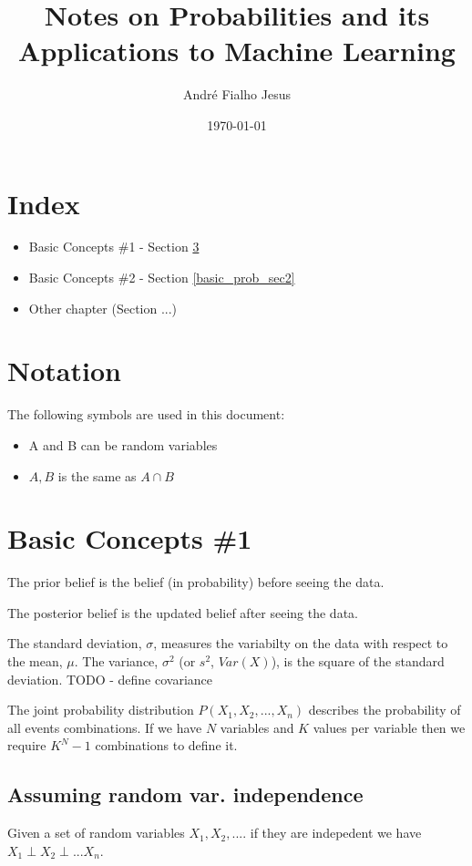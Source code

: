 \documentclass[12pt]{article}
\title{Notes on Probabilities and its Applications to Machine Learning}
\author{André Fialho Jesus}
\date{\today}
\begin{document}
\maketitle

\section{Index}
\begin{itemize}
    \item Basic Concepts \#1 - Section \ref{basic_prob_sec1}
    \item Basic Concepts \#2 - Section \ref{basic_prob_sec2}
    \item Other chapter (Section ...)
\end{itemize}

\section{Notation}
The following symbols are used in this document:
\begin{itemize}
    \item A and B can be random variables
    \item $A, B$ is the same as $A \cap B$ 
\end{itemize}


\section{Basic Concepts \#1}\label{basic_prob_sec1}


The prior belief is the belief (in probability) before seeing the data.

The posterior belief is the updated belief after seeing the data.

The standard deviation, $\sigma$, measures the variabilty on the data with respect to the mean, $\mu$.
The variance, $\sigma^2$ (or $s^2$, $Var(X)$), is the square of the standard deviation.
TODO - define covariance  

The joint probability distribution $P(X_1, X_2, ..., X_n)$ describes the probability of all events combinations.
If we have $N$ variables and $K$ values per variable then we require $K^N-1$ combinations to define it.




\subsection{Assuming random var. independence}
Given a set of random variables $X_1, X_2, ....$ if they are indepedent we have $X_1 \perp X_2 \perp ... X_n$.
\end{document}
